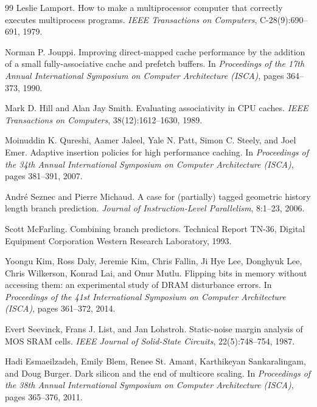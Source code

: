 \documentclass[11pt,a4paper]{report}
\begin{document}
\begin{thebibliography}{99}
Leslie Lamport.
How to make a multiprocessor computer that correctly executes
multiprocess programs.
\emph{IEEE Transactions on Computers}, C-28(9):690--691, 1979.

Norman P. Jouppi.
Improving direct-mapped cache performance by the addition of a small
fully-associative cache and prefetch buffers.
In \emph{Proceedings of the 17th Annual International Symposium on
Computer Architecture (ISCA)}, pages 364--373, 1990.

Mark D. Hill and Alan Jay Smith.
Evaluating associativity in CPU caches.
\emph{IEEE Transactions on Computers}, 38(12):1612--1630, 1989.

Moinuddin K. Qureshi, Aamer Jaleel, Yale N. Patt, Simon C. Steely,
and Joel Emer.
Adaptive insertion policies for high performance caching.
In \emph{Proceedings of the 34th Annual International Symposium on
Computer Architecture (ISCA)}, pages 381--391, 2007.

Andr\'e Seznec and Pierre Michaud.
A case for (partially) tagged geometric history length branch prediction.
\emph{Journal of Instruction-Level Parallelism}, 8:1--23, 2006.

Scott McFarling.
Combining branch predictors.
Technical Report TN-36, Digital Equipment Corporation Western Research
Laboratory, 1993.

Yoongu Kim, Ross Daly, Jeremie Kim, Chris Fallin, Ji Hye Lee,
Donghyuk Lee, Chris Wilkerson, Konrad Lai, and Onur Mutlu.
Flipping bits in memory without accessing them: an experimental study
of DRAM disturbance errors.
In \emph{Proceedings of the 41st International Symposium on Computer
Architecture (ISCA)}, pages 361--372, 2014.

Evert Seevinck, Frans J. List, and Jan Lohstroh.
Static-noise margin analysis of MOS SRAM cells.
\emph{IEEE Journal of Solid-State Circuits}, 22(5):748--754, 1987.

Hadi Esmaeilzadeh, Emily Blem, Renee St. Amant,
Karthikeyan Sankaralingam, and Doug Burger.
Dark silicon and the end of multicore scaling.
In \emph{Proceedings of the 38th Annual International Symposium on
Computer Architecture (ISCA)}, pages 365--376, 2011.


\end{thebibliography}
\end{document}
